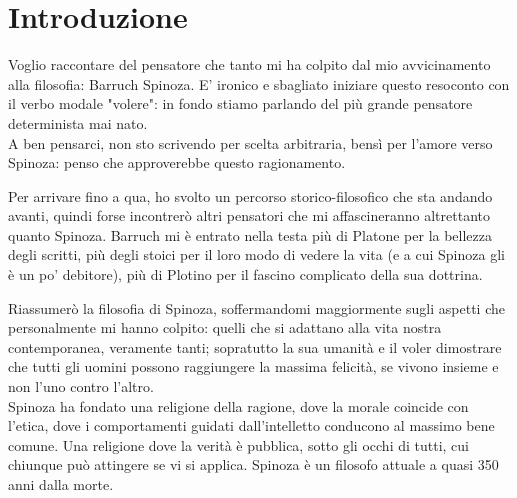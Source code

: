 
\chapter*{Introduzione}

Voglio raccontare del pensatore che tanto mi ha colpito dal mio avvicinamento alla filosofia: Barruch Spinoza. E' ironico e sbagliato iniziare questo resoconto con il verbo modale "volere": in fondo stiamo parlando del più grande pensatore determinista mai nato.\\
A ben pensarci, non sto scrivendo per scelta arbitraria, bensì per l'amore verso Spinoza: penso che approverebbe questo ragionamento.

Per arrivare fino a qua, ho svolto un percorso storico-filosofico che sta andando avanti, quindi forse incontrerò  altri pensatori che mi affascineranno altrettanto quanto Spinoza. Barruch mi è entrato nella testa più di Platone per la bellezza degli scritti, più degli stoici per il loro modo di vedere la vita (e a cui Spinoza gli è un po' debitore), più di Plotino per il fascino complicato della sua dottrina.

Riassumerò la filosofia di Spinoza, soffermandomi maggiormente sugli aspetti che  personalmente mi hanno colpito: quelli che si adattano alla vita nostra contemporanea, veramente tanti; sopratutto la sua umanità e il voler dimostrare che tutti gli uomini possono raggiungere la massima felicità, se vivono insieme e non l'uno contro l'altro.\\
Spinoza ha fondato una religione della ragione, dove la morale coincide con l'etica, dove i comportamenti guidati dall'intelletto conducono al massimo bene comune. Una religione dove la verità è pubblica, sotto gli occhi di tutti, cui chiunque può attingere se vi si applica.
Spinoza è un filosofo attuale a quasi 350 anni dalla morte.


\newpage